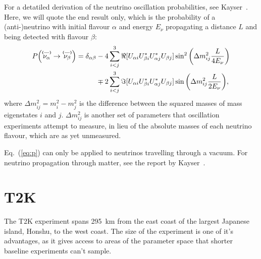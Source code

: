 \documentclass[aps,pra,12pt,notitlepage,tightenlines]{revtex4-1}
\newcommand\barparen[1]{\overset{\textbf{\fontsize{5pt}{5pt}\selectfont(---)}}{#1}}
\begin{document}
For a detatiled derivation of the neutrino oscillation probabilities, see Kayser~\cite{Kayser:2011jn}. Here, we will quote the end result only, which is the probability of a \mbox{(anti-)neutrino} with initial flavour $\alpha$ and energy $E_\nu$ propagating a distance $L$ and being detected with flavour $\beta$:
\begin{align}
\label{eq:p}
P\Big(\barparen{\nu_\alpha}\rightarrow\barparen{\nu_\beta}\Big) = \delta_{\alpha\beta}&-4\sum^3_{i<j}\Re[U_{\alpha i}U_{\beta i}^*U_{\alpha j}^*U_{\beta j}]\sin^2\bigg(\Delta m^2_{ij}\frac{L}{4E_\nu}\bigg) \notag \\
& \mp 2\sum^3_{i<j}\Im[U_{\alpha i}U_{\beta i}^*U_{\alpha j}^*U_{\beta j}]\sin\bigg(\Delta m^2_{ij}\frac{L}{2E_\nu}\bigg),
\end{align}
where $\Delta m^2_{ij} = m^2_i - m^2_j$ is the difference between the squared masses of mass eigenstates $i$ and $j$. $\Delta m^2_{ij}$ is another set of parameters that oscillation experiments attempt to measure, in lieu of the absolute masses of each neutrino flavour, which are as yet unmeasured.

Eq.~(\ref{eq:p}) can only be applied to neutrinos travelling through a vacuum. For neutrino propagation through matter, see the report by Kayser~\cite{Kayser:2005cd}.

\section{T2K}
The T2K experiment spans 295~km from the east coast of the largest Japanese island, Honshu, to the west coast. The size of the experiment is one of it's advantages, as it gives access to areas of the parameter space that shorter baseline experiments can't sample. 
\end{document}
